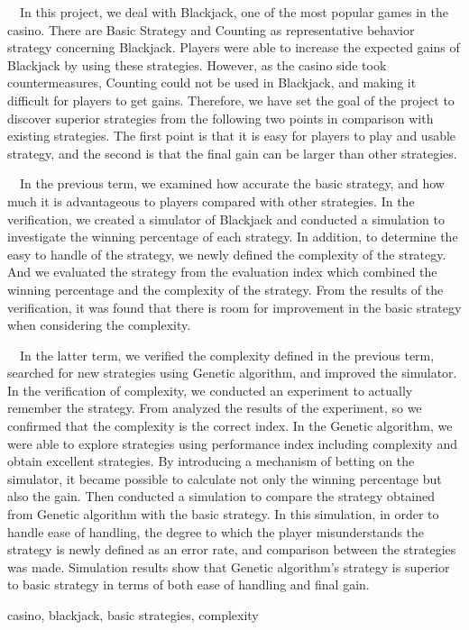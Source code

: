 \documentclass[11pt,a4paper,oneside]{jsbook}
\begin{document}
\begin{eabstract}
\ \  In this project, we deal with Blackjack, one of the most popular games in the casino. There are Basic Strategy and Counting as representative behavior strategy concerning Blackjack. Players were able to increase the expected gains of Blackjack by using these strategies.  However, as the casino side took countermeasures, Counting could not be used in Blackjack, and making it difficult for players to get gains. Therefore, we have set the goal of the project to discover superior strategies from the following two points in comparison with existing strategies. The first point is that it is easy for players to play and usable strategy, and the second is that the final gain can be larger than other strategies.

\ \ In the previous term, we examined how accurate the basic strategy, and how much it is advantageous to players compared with other strategies. In the verification, we created a simulator of Blackjack and conducted a simulation to investigate the winning percentage of each strategy. In addition, to determine the easy to handle of the strategy, we newly defined the complexity of the strategy. And we evaluated the strategy from the evaluation index which combined the winning percentage and the complexity of the strategy. From the results of the verification, it was found that there is room for improvement in the basic strategy when considering the complexity.

\ \ In the latter term, we verified the complexity defined in the previous term, searched for new strategies using Genetic algorithm, and improved the simulator. In the verification of complexity, we conducted an experiment to actually remember the strategy. From analyzed the results of the experiment, so we confirmed that the complexity is the correct index. In the Genetic algorithm, we were able to explore strategies using performance index including complexity and obtain excellent strategies. By introducing a mechanism of betting on the simulator, it became possible to calculate not only the winning percentage but also the gain. Then conducted a simulation to compare the strategy obtained from Genetic algorithm with the basic strategy. In this simulation, in order to handle ease of handling, the degree to which the player misunderstands the strategy is newly defined as an error rate, and comparison between the strategies was made. Simulation results show that Genetic algorithm's strategy is superior to basic strategy in terms of both ease of handling and final gain.

\begin{ekeyword}
casino, blackjack, basic strategies, complexity
\end{ekeyword}
\end{eabstract}
\end{document}
